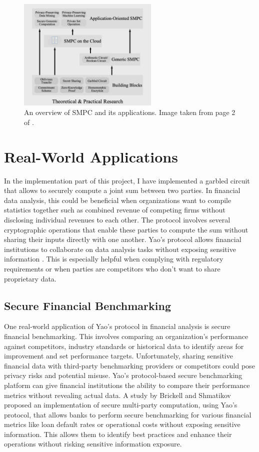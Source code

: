 \documentclass[12pt]{article}
\begin{document}
\begin{figure}[h]
    \centering
    \includegraphics[width=0.6\textwidth]{practicalapplications.png}
    \caption{An overview of SMPC and its applications. Image taken from page 2 of \cite{Applications}.}\label{fig:applications}
\end{figure}

\section{Real-World Applications}\label{sec:applications}

In the implementation part of this project, I have implemented a garbled circuit that allows to securely compute a joint sum between two parties. In financial data analysis, this could be beneficial when organizations want to compile statistics together such as combined revenue of competing firms without disclosing individual revenues to each other. The protocol involves several cryptographic operations that enable these parties to compute the sum without sharing their inputs directly with one another.
Yao's protocol allows financial institutions to collaborate on data analysis tasks without exposing sensitive information \cite{Analysis}. This is especially helpful when complying with regulatory requirements or when parties are competitors who don't want to share proprietary data.

\subsection{Secure Financial Benchmarking}
One real-world application of Yao's protocol in financial analysis is secure financial benchmarking. This involves comparing an organization's performance against competitors, industry standards or historical data to identify areas for improvement and set performance targets. Unfortunately, sharing sensitive financial data with third-party benchmarking providers or competitors could pose privacy risks and potential misuse.
Yao's protocol-based secure benchmarking platform can give financial institutions the ability to compare their performance metrics without revealing actual data. A study by Brickell and Shmatikov \cite{Publishing} proposed an implementation of secure multi-party computation, using Yao's protocol, that allows banks to perform secure benchmarking for various financial metrics like loan default rates or operational costs without exposing sensitive information. This allows them to identify best practices and enhance their operations without risking sensitive information exposure.
\end{document}
